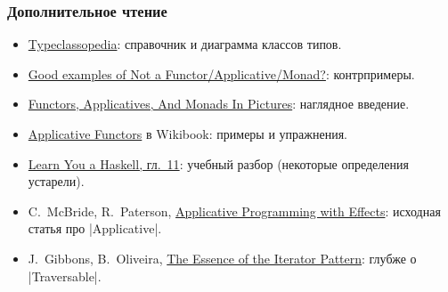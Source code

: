\documentclass[11pt]{beamer}
\begin{document}
\begin{frame}[fragile]
  \frametitle{Дополнительное чтение}
  \begin{itemize}
    \item \href{https://wiki.haskell.org/Typeclassopedia}{Typeclassopedia}: справочник и диаграмма классов типов.
    \item \href{https://stackoverflow.com/questions/7220436/good-examples-of-not-a-functor-functor-applicative-monad}{Good examples of Not a Functor/Applicative/Monad?}: контрпримеры.
    \item \href{http://adit.io/posts/2013-04-17-functors,_applicatives,_and_monads_in_pictures.html}{Functors, Applicatives, And Monads In Pictures}: наглядное введение.
    \item \href{https://en.wikibooks.org/wiki/Haskell/Applicative_functors}{Applicative Functors} в Wikibook: примеры и упражнения.
    \item \href{https://learnyouahaskell.github.io/functors-applicative-functors-and-monoids.html}{Learn You a Haskell, гл.~11}: учебный разбор (некоторые определения устарели).
    \item C.~McBride, R.~Paterson, \href{https://openaccess.city.ac.uk/13222/1/Applicative-final.pdf}{Applicative Programming with Effects}: исходная статья про \haskinline|Applicative|.
    \item J.~Gibbons, B.~Oliveira, \href{https://www.cs.ox.ac.uk/jeremy.gibbons/publications/iterator-msfp.pdf}{The Essence of the Iterator Pattern}: глубже о \haskinline|Traversable|.
  \end{itemize}
\end{frame}
\end{document}
